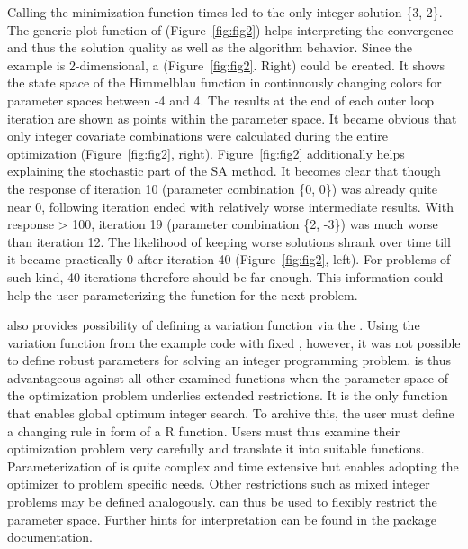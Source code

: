 Calling the minimization function times led to the only integer solution \{3, 2\}. The generic plot function of  (Figure~\ref{fig:fig2}) helps interpreting the convergence and thus the solution quality as well as the algorithm behavior. Since the example is 2-dimensional, a  (Figure~\ref{fig:fig2}. Right) could be created. It shows the state space of the Himmelblau function in continuously changing colors for parameter spaces between -4 and 4.  The results at the end of each outer loop iteration are shown as points within the parameter space. It became obvious that only integer covariate combinations were calculated during the entire optimization (Figure~\ref{fig:fig2}, right). Figure~\ref{fig:fig2} additionally helps explaining the stochastic part of the SA method. It becomes clear that though the response of iteration 10 (parameter combination \{0, 0\}) was already quite near 0, following iteration ended with relatively worse intermediate results. With response > 100, iteration 19 (parameter combination \{2, -3\}) was much worse than iteration 12. The likelihood of keeping worse solutions shrank over time till it became practically 0 after iteration 40 (Figure~\ref{fig:fig2}, left). For problems of such kind, 40 iterations therefore should be far enough. This information could help the user parameterizing the function for the next problem.

 also provides possibility of defining a variation function via the . Using the variation function from the example code with fixed , however, it was not possible to define robust parameters for solving an integer programming problem.  is thus advantageous against all other examined functions when the parameter space of the optimization problem underlies extended restrictions. It is the only function that enables global optimum integer search. To archive this, the user must define a changing rule in form of a R function. Users must thus examine their optimization problem very carefully and translate it into suitable functions. Parameterization of  is quite complex and time extensive but enables adopting the optimizer to problem specific needs. Other restrictions such as mixed integer problems may be defined analogously.  can thus be used to flexibly restrict the parameter space. Further hints for interpretation can be found in the package documentation.

